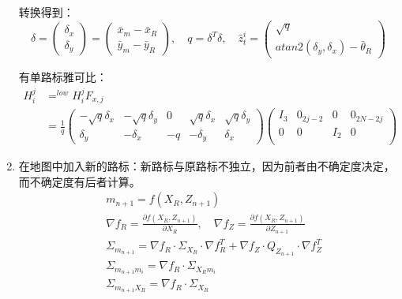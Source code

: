 \documentclass[
12pt, %
a4paper, 
oneside, %
headinclude,footinclude, %
]{scrartcl}
\begin{document}
\begin{enumerate}
转换得到：
$$
\delta = \begin{pmatrix} \delta_x \\ \delta_y \end{pmatrix} = \begin{pmatrix} \bar{x}_m - \bar{x}_R \\ \bar{y}_m - \bar{y}_R \end{pmatrix}, \quad
q = \delta^T \delta, \quad
\hat{z}_t^i = \begin{pmatrix} \sqrt{q} \\ atan2(\delta_y, \delta_x) - \bar{\theta}_R \end{pmatrix}
$$

有单路标雅可比：
\begin{align*}
H_i^j &= ^{low}H_i^j F_{x, j} \\
&= \frac{1}{q} \begin{pmatrix} -\sqrt{q}\delta_x & -\sqrt{q}\delta_y & 0 & \sqrt{q}\delta_x & \sqrt{q}\delta_y \\ \delta_y & -\delta_x & -q & -\delta_y & \delta_x \end{pmatrix} 
\begin{pmatrix} 
I_3 & 0_{2j - 2} & 0 & 0_{2N - 2j}  \\
0 & 0 & I_2 & 0 \\
\end{pmatrix}
\end{align*}
\item 在地图中加入新的路标：新路标与原路标不独立，因为前者由不确定度决定，而不确定度有后者计算。
\begin{align*}
&m_{n + 1} = f(X_R, Z_{n + 1}) \\
&\nabla f_R = \frac{\partial f(X_R, Z_{n + 1})}{\partial X_R}, \quad \nabla f_Z = \frac{\partial f(X_R, Z_{n + 1})}{\partial Z_{n + 1}} \\
&\Sigma_{m_{n + 1}} = \nabla f_R \cdot \Sigma_{X_R} \cdot \nabla f_R^T + \nabla f_Z \cdot Q_{Z_{n + 1}} \cdot \nabla f_Z^T \\\
&\Sigma_{m_{n + 1}m_i} = \nabla f_R \cdot \Sigma_{X_R m_i} \\
&\Sigma_{m_{n + 1}X_R} = \nabla f_R \cdot \Sigma_{X_R}
\end{align*}


\end{enumerate}
\end{document}
